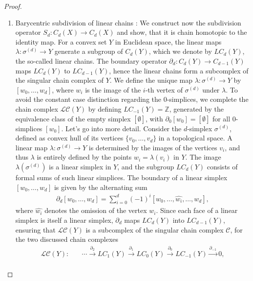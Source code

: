 \begin{proof}
\begin{enumerate}
	\item Barycentric subdivision of linear chains \cite[Proposition 2.21 (2)]{hatcher2005algebraic}: We construct now the subdivision operator $S_d: C_d(X) \rightarrow C_d(X)$ and show, that it is chain homotopic to the identity map. For a convex set \(Y\) in Euclidean space, the linear maps \(\lambda: \sigma^{(d)} \rightarrow Y\) generate a subgroup of \(C_d(Y)\), which we denote by \(LC_d(Y)\), the so-called linear chains. The boundary operator \(\partial_d: C_d(Y) \rightarrow C_{d-1}(Y)\) maps \(LC_d(Y)\) to \(LC_{d-1}(Y)\), hence the linear chains form a subcomplex of the singular chain complex of \(Y\). We define the unique map \(\lambda: \sigma^{(d)} \rightarrow Y\) by \([w_0, \ldots, w_d]\), where \(w_i\) is the image of the \(i\)-th vertex of \(\sigma^{(d)}\) under \(\lambda\). To avoid the constant case distinction regarding the \(0\)-simplices, we complete the chain complex \(\mathcal{LC}(Y)\) by defining \(LC_{-1}(Y) = \mathbb{Z}\), generated by the equivalence class of the empty simplex \([\emptyset]\), with \(\partial_0[w_0] = [\emptyset]\) for all \(0\)-simplices \([w_0]\). Let's go into more detail. Consider the \(d\)-simplex \(\sigma^{(d)}\), defined as convex hull of its vertices \(\{v_0, \ldots, v_d\}\) in a topological space. A linear map \(\lambda: \sigma^{(d)} \rightarrow Y\) is determined by the images of the vertices \(v_i\), and thus \(\lambda\) is entirely defined by the points \(w_i = \lambda(v_i)\) in \(Y\). The image \(\lambda(\sigma^{(d)})\) is a linear simplex in \(Y\), and the subgroup \(LC_d(Y)\) consists of formal sums of such linear simplices. The boundary of a linear simplex \([w_0, \ldots, w_d]\) is given by the alternating sum
	\begin{align}
		\partial_d[w_0, \ldots, w_d] = \sum_{i=0}^d (-1)^i [w_0, \ldots, \hat{w_i}, \ldots, w_d], 
	\end{align}
	where \(\hat{w_i}\) denotes the omission of the vertex \(w_i\). Since each face of a linear simplex is itself a linear simplex, \(\partial_d\) maps \(LC_d(Y)\) into \(LC_{d-1}(Y)\), ensuring that \(\mathcal{LC}(Y)\) is a subcomplex of the singular chain complex \(\mathcal{C}\), for the two discussed chain complexes
	\begin{align}
		\mathcal{LC}(Y): &\quad \cdots \xrightarrow{\partial_{2}} LC_{1}(Y) \xrightarrow{\partial_{1}} LC_0(Y) \xrightarrow{\partial_{0}} LC_{-1}(Y) \xrightarrow{\partial_{-1}} 0, \\

\end{align}
\end{enumerate}
\end{proof}
